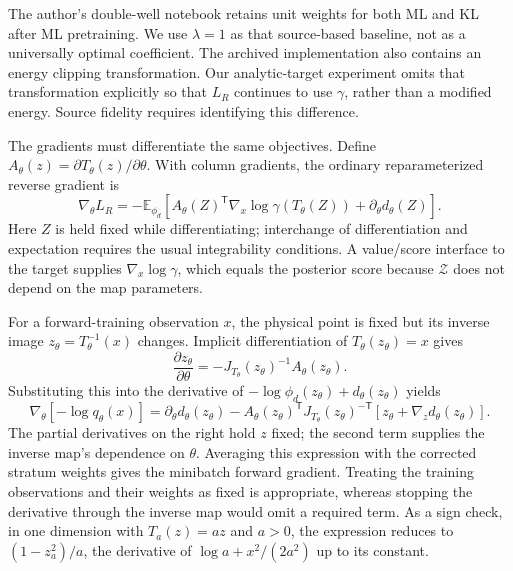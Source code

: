 The author's double-well notebook retains unit weights for both ML and KL
after ML pretraining. We use $\lambda=1$ as that source-based baseline, not
as a universally optimal coefficient. The archived implementation also contains
an energy clipping transformation. Our analytic-target experiment omits that
transformation explicitly so that $L_R$ continues to use $\gamma$, rather than
a modified energy. Source fidelity requires identifying this difference.

The gradients must differentiate the same objectives. Define
$A_\theta(z)=\partial T_\theta(z)/\partial\theta$. With column gradients,
the ordinary reparameterized reverse gradient is
\begin{equation}
 \nabla_\theta L_R
 =-\mathbb E_{\phi_d}\left[
 A_\theta(Z)^\mathsf T\nabla_x\log\gamma(T_\theta(Z))
 +\partial_\theta d_\theta(Z)\right].
 \label{eq:controlled-reverse-gradient}
\end{equation}
Here $Z$ is held fixed while differentiating; interchange of differentiation
and expectation requires the usual integrability conditions. A value/score
interface to the target supplies $\nabla_x\log\gamma$, which equals the
posterior score because $\mathcal Z$ does not depend on the map parameters.

For a forward-training observation $x$, the physical point is fixed but its
inverse image $z_\theta=T_\theta^{-1}(x)$ changes. Implicit differentiation
of $T_\theta(z_\theta)=x$ gives
\begin{equation}
 \frac{\partial z_\theta}{\partial\theta}
 =-J_{T_\theta}(z_\theta)^{-1}A_\theta(z_\theta).
 \label{eq:controlled-parameter-inverse-derivative}
\end{equation}
Substituting this into the derivative of
$-\log\phi_d(z_\theta)+d_\theta(z_\theta)$ yields
\begin{equation}
 \nabla_\theta[-\log q_\theta(x)]
 =\partial_\theta d_\theta(z_\theta)
 -A_\theta(z_\theta)^\mathsf T J_{T_\theta}(z_\theta)^{-\mathsf T}
       [z_\theta+\nabla_z d_\theta(z_\theta)].
 \label{eq:controlled-forward-gradient}
\end{equation}
The partial derivatives on the right hold $z$ fixed; the second term supplies
the inverse map's dependence on $\theta$. Averaging this expression with the
corrected stratum weights gives the minibatch forward gradient. Treating the
training observations and their weights as fixed is appropriate, whereas
stopping the derivative through the inverse map would omit a required term.
As a sign check, in one dimension with $T_a(z)=az$ and $a>0$, the expression
reduces to $(1-z_a^2)/a$, the derivative of
$\log a+x^2/(2a^2)$ up to its constant.

